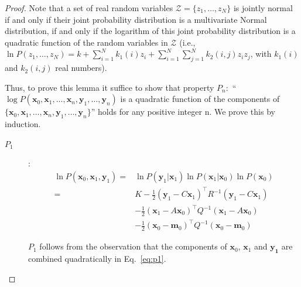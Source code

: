 \documentclass[12pt]{article}
\begin{document}
\begin{proof}

    Note that a set of real random variables $\mathcal{Z}=\{z_1,\ldots,z_N\}$ is
    jointly normal if and only if their joint probability distribution is a
    multivariate Normal distribution, if and only if the logarithm of this
    joint probability distribution is a quadratic function of the random
    variables in $\mathcal{Z}$ (i.e., $\ln P(z_1,\ldots,z_N)=k+\sum_{i=1}^N
    k_1(i)z_i+\sum_{i=1}^N\sum_{j=1}^Nk_2(i,j)z_iz_j$, with $k_1(i)$ and
    $k_2(i,j)$ real numbers).

    Thus, to prove this lemma it suffice to show that property $P_n$:\ ``$\log
    P(\mathbf{x}_0, \mathbf{x}_1, \ldots, \mathbf{x}_n, \mathbf{y}_1, \ldots,
    \mathbf{y}_n)$  is a quadratic function of the components of
    $\{\mathbf{x}_0, \mathbf{x}_1, \ldots, \mathbf{x}_n, \mathbf{y}_1, \ldots,
    \mathbf{y}_n\}$'' holds for any positive integer n. We prove this by
    induction.

    \begin{description}
        \item[$P_1$]:
            \begin{align}
                \ln P(\mathbf{x}_0, \mathbf{x}_1, \mathbf{y}_1)=&\ln P(\mathbf{y}_1|\mathbf{x}_1)\ln P(\mathbf{x}_1|\mathbf{x}_0)\ln P(\mathbf{x}_0)\nonumber\\
                                                               =&K-\frac{1}{2}(\mathbf{y}_1-C\mathbf{x}_1)^\intercal R^{-1}(\mathbf{y}_1-C\mathbf{x}_1)\nonumber\\
                                                                &-\frac{1}{2}(\mathbf{x}_1-A\mathbf{x}_0)^\intercal Q^{-1}(\mathbf{x}_1-A\mathbf{x}_0)\nonumber\\
                                                                &-\frac{1}{2}(\mathbf{x}_0-\mathbf{m}_0)^\intercal Q^{-1}(\mathbf{x}_0-\mathbf{m}_0)\label{eq:p1}
            \end{align}

            $P_1$ follows from the observation that the components of
            $\mathbf{x}_0$, $\mathbf{x}_1$ and $\mathbf{y_1}$ are combined
            quadratically in Eq.~\ref{eq:p1}.


\end{description}
\end{proof}
\end{document}
